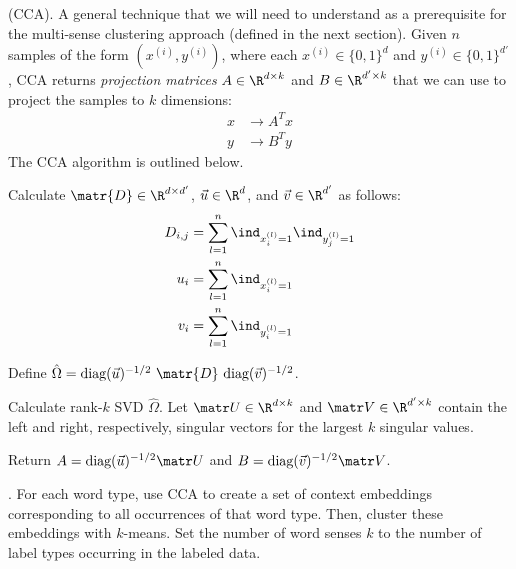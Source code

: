 \documentclass[11pt]{article}
\begin{document}
\myspace
\p {} (CCA). A general technique that we will need to understand as a prerequisite for the multi-sense clustering approach (defined in the next section). Given $n$ samples of the form $(x^{(i)}, y^{(i)})$, where each $x^{(i)} \in \{0, 1\}^d$ and $y^{(i)} \in \{0, 1\}^{d'}$, CCA returns \textit{projection matrices} $A \in \R^{d \times k}$ and $B \in \R^{d' \times k}$ that we can use to project the samples to $k$ dimensions:
\begin{align}
x &\longrightarrow A^T x \\
y &\longrightarrow B^T y 
\end{align}
The CCA algorithm is outlined below.
\begin{example}
	\begin{compactenum}
		\item Calculate $\matr{D} \in \R^{d \times d'}$, $\vec u \in \R^d$, and $\vec v \in \R^{d'}$ as follows:
		\begin{align}
		D_{i,j} &= \sum_{l = 1}^{n} \ind_{x_i^{(l)} = 1}  \ind_{y_j^{(l)} = 1} \\
		u_i &= \sum_{l = 1}^{n}  \ind_{x_i^{(l)} = 1} \\
		v_i &= \sum_{l = 1}^{n}  \ind_{y_i^{(l)} = 1}
		\end{align}
		
		\item Define $\hat{\Omega} = \text{diag}(\vec u)^{-1/2} ~ \matr{D} ~ \text{diag}(\vec v)^{-1/2}$. 
		
		\item Calculate rank-$k$ SVD $\hat{\Omega}$. Let $\matr U \in \R^{d \times k}$ and $\matr V \in \R^{d' \times k}$ contain the left and right, respectively, singular vectors for the largest $k$ singular values. 
		
		\item Return $A = \text{diag}(\vec u)^{-1/2} \matr U$ and $B = \text{diag}(\vec v)^{-1/2} \matr V$. 
	\end{compactenum}
\end{example}

\myspace
\p {}. For each word type, use CCA to create a set of context embeddings corresponding to all occurrences of that word type. Then, cluster these embeddings with $k$-means. Set the number of word senses $k$ to the number of label types occurring in the labeled data.\\
\end{document}
